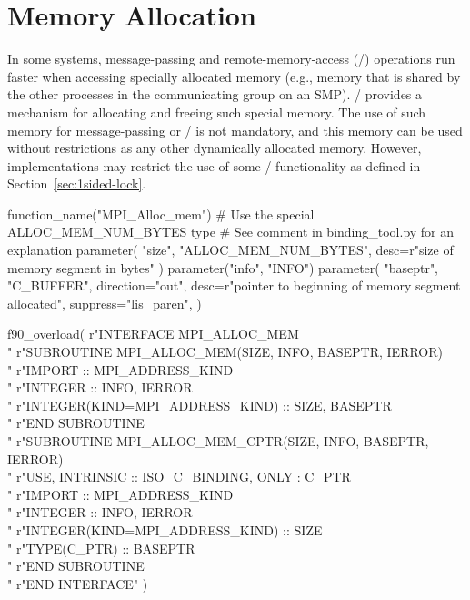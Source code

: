 \section{Memory Allocation}
\label{sec:misc-memalloc}

In some systems, message-passing and remote-memory-access (\RMA/) operations
run faster when accessing specially allocated memory (e.g., memory that is
shared by the other processes in the communicating group on an SMP).  \MPI/
provides a mechanism for allocating and freeing such special memory.  The use
of such memory for message-passing or \RMA/ is not mandatory, and this memory
can be used without restrictions as any other dynamically allocated memory.
However, implementations may restrict the use of some \RMA/ functionality as defined
in Section~\ref{sec:1sided-lock}.

%
\begin{mpi-binding}
    function_name("MPI_Alloc_mem")
    # Use the special ALLOC_MEM_NUM_BYTES type
    # See comment in binding_tool.py for an explanation
    parameter(
        "size", "ALLOC_MEM_NUM_BYTES", desc=r"size of memory segment in bytes"
    )
    parameter("info", "INFO")
    parameter(
        "baseptr",
        "C_BUFFER",
        direction="out",
        desc=r"pointer to beginning of memory segment allocated",
        suppress="lis_paren",
    )
    
    f90_overload(
        r"\>INTERFACE MPI\_ALLOC\_MEM \\ "
        r"\>\>SUBROUTINE MPI\_ALLOC\_MEM(SIZE, INFO, BASEPTR, IERROR) \\ "
        r"\>\>\>IMPORT :: MPI\_ADDRESS\_KIND \\ "
        r"\>\>\>INTEGER :: INFO, IERROR \\ "
        r"\>\>\>INTEGER(KIND=MPI\_ADDRESS\_KIND) :: SIZE, BASEPTR \\ "
        r"\>\>END SUBROUTINE \\ "
        r"\>\>SUBROUTINE MPI\_ALLOC\_MEM\_CPTR(SIZE, INFO, BASEPTR, IERROR) \\ "
        r"\>\>\>USE, INTRINSIC :: ISO\_C\_BINDING, ONLY : C\_PTR \\ "
        r"\>\>\>IMPORT :: MPI\_ADDRESS\_KIND \\ "
        r"\>\>\>INTEGER :: INFO, IERROR \\ "
        r"\>\>\>INTEGER(KIND=MPI\_ADDRESS\_KIND) :: SIZE \\ "
        r"\>\>\>TYPE(C\_PTR) :: BASEPTR \\ "
        r"\>\>END SUBROUTINE \\ "
        r"\>END INTERFACE"
    )
\end{mpi-binding}

